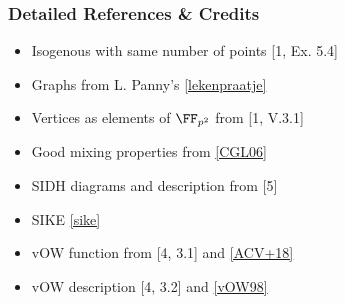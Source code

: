 \documentclass{beamer}
\begin{document}
\begin{frame}[noframenumbering]
    \frametitle{Detailed References \& Credits}
    \begin{itemize}
        \item Isogenous with same number of points [1, Ex. 5.4]
        \item Graphs from L. Panny's \href{https://yx7.cc/docs/phd/lekenpraatje.pdf}{[lekenpraatje]}
        \item Vertices as elements of $\FF_{p^2}$ from [1, V.3.1]
        \item Good mixing properties from \href{https://eprint.iacr.org/2006/021.pdf}{[CGL06]}
        \item SIDH diagrams and description from [5]
        \item SIKE \href{https://sike.org}{[sike]}
        \item vOW function from [4, 3.1] and \href{https://eprint.iacr.org/2018/313.pdf}{[ACV+18]}
        \item vOW description [4, 3.2] and \href{https://link.springer.com/content/pdf/10.1007/PL00003816.pdf}{[vOW98]}
      \end{itemize}
\end{frame}
\end{document}
